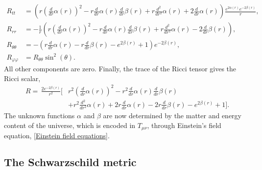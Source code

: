 \begin{align}
    \label{tt component ricci tensor}
    R_{tt}
    & =
    \left(r \left(\frac{d}{d r} \alpha{\left(r \right)}\right)^{2} - r \frac{d}{d r} \alpha{\left(r \right)} \frac{d}{d r} \beta{\left(r \right)} + r \frac{d^{2}}{d r^{2}} \alpha{\left(r \right)} + 2 \frac{d}{d r} \alpha{\left(r \right)}
        \right)
    \frac{
         e^{2 \alpha{\left(r \right)}} e^{- 2 \beta{\left(r \right)}}}{r}, \\
    \label{rr component ricci tensor}
    R_{rr}
    & =
    - \frac{1}{r}
    \left(
        r \left(\frac{d}{d r} \alpha{\left(r \right)}\right)^{2} - r \frac{d}{d r} \alpha{\left(r \right)} \frac{d}{d r} \beta{\left(r \right)} + r \frac{d^{2}}{d r^{2}} \alpha{\left(r \right)} - 2 \frac{d}{d r} \beta{\left(r \right)} 
    \right),\\
    \label{thetatheta component ricci tensor}
    R_{\theta \theta}
    &=
    - \left(r \frac{d}{d r} \alpha{\left(r \right)} - r \frac{d}{d r} \beta{\left(r \right)} - e^{2 \beta{\left(r \right)}} + 1\right) e^{- 2 \beta{\left(r \right)}}, \\
    R_{\varphi \varphi} & = R_{\theta \theta} \sin^2( \theta).
\end{align}
%
All other components are zero.
Finally, the trace of the Ricci tensor gives the Ricci scalar,
%
\begin{align}
    \nonumber
    R =
    \, \frac{2 e^{- 2 \beta{\left(r \right)}}}{r^{2}}
    \bigg[
        &
        r^{2} \left(\frac{d}{d r} \alpha{\left(r \right)}\right)^{2} 
        - r^{2} \frac{d}{d r} \alpha{\left(r \right)} \frac{d}{d r} \beta{\left(r \right)}
        \\ &
        + r^{2} \frac{d^{2}}{d r^{2}} \alpha{\left(r \right)} 
        + 2 r \frac{d}{d r} \alpha{\left(r \right)} 
        - 2 r \frac{d}{d r} \beta{\left(r \right)} - e^{2 \beta{\left(r \right)}} + 1
    \bigg].
\end{align}
%
 The unknown functions $\alpha$ and $\beta$ are now determined by the matter and energy content of the universe, which is encoded in $T_{\mu \nu}$, through Einstein's field equation, \autoref{Einstein field equations}. 



\subsection{The Schwarzschild metric}


